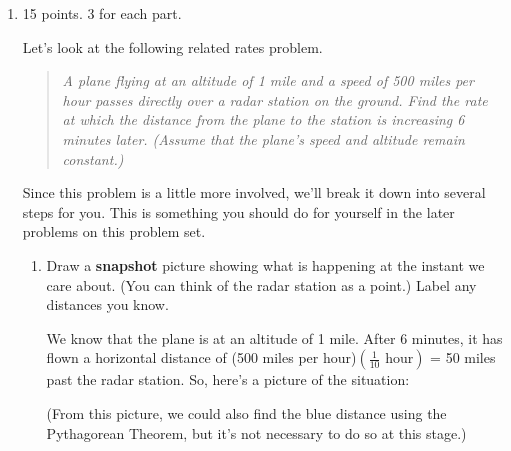 \documentclass{article}
\begin{document}
\begin{enumerate}

\item

\begin{grading}
15 points. 3 for each part.
\end{grading}

{
    \newcommand{\graphinside}{
      \coordinate (station) at (0, 0);
      \coordinate (plane) at (5, 1);
      \draw ($-0.2*(plane|-station)$) -- ($1.2*(plane|-station)$);
      \filldraw (station) circle (1.5pt) node[anchor=north east, text
      width=1cm, align=center] {radar station};
      \filldraw (plane) circle (1.5pt) node[above] {airplane};
    }

    Let's look at the following related rates problem.
    \begin{quote}   %
      \textit{A plane flying at an altitude of 1 mile and a speed of 500 miles per
      hour passes directly over a radar station on the ground.  Find the
      rate at which the distance from the plane to the station is increasing
      6 minutes later.  (Assume that the plane's speed and altitude remain
      constant.)}
    \end{quote}

    Since this problem is a little more involved, we'll break it down
      into several steps for you.  This is something you should do for
      yourself in the later problems on this problem set.
    \begin{enumerate}
    \item
\begin{problem}
        Draw a \textbf{snapshot} picture showing what is happening at the
        instant we care about.  (You can think of the radar station as a
        point.)  Label any distances you know.
      \end{problem}
      \pspace{\vfill}

      \begin{solution}
        We know that the plane is at an altitude of 1 mile.  After 6
        minutes, it has flown a horizontal distance of (500 miles per
        hour)$\left( \frac{1}{10} \text{ hour} \right)$ = 50 miles past the
        radar station.  So, here's a picture of the situation:
        \begin{center}
        \end{center}
        (From this picture, we could also find the blue distance using the
        Pythagorean Theorem, but it's not necessary to do so at this
        stage.) 
      \end{solution}


\end{enumerate}}
\end{enumerate}
\end{document}
